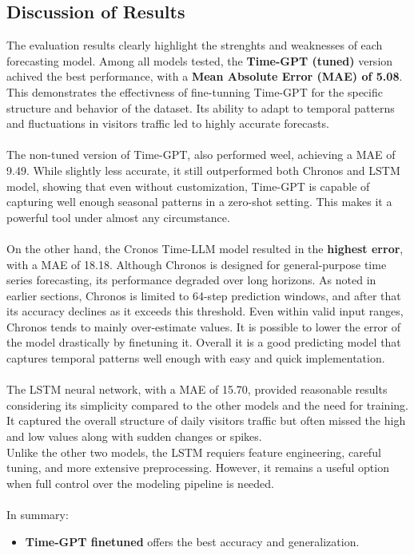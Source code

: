 \documentclass{article}
\begin{document}
\subsection{Discussion of Results}
 The evaluation results clearly highlight the strenghts and weaknesses of each forecasting model. Among all models tested, the \textbf{Time-GPT (tuned)} version achived the best performance, with a \textbf{Mean Absolute Error (MAE) of 5.08}. This demonstrates the effectivness of fine-tunning Time-GPT for the specific structure and behavior of the dataset. Its ability to adapt to temporal patterns and fluctuations in visitors traffic led to highly accurate forecasts.\\
 \\
 The non-tuned version of Time-GPT, also performed weel, achieving a MAE of 9.49. While slightly less accurate, it still outperformed both Chronos and LSTM model, showing that even without customization, Time-GPT is capable of capturing well enough seasonal patterns in a zero-shot setting. This makes it a powerful tool under almost any circumstance.\\
 \\
 On the other hand, the Cronos Time-LLM model resulted in the \textbf{highest error}, with a MAE of 18.18. Although Chronos is designed for general-purpose time series forecasting, its performance degraded over long horizons. As noted in earlier sections, Chronos is limited to 64-step prediction windows, and after that its accuracy declines as it exceeds this threshold. Even within valid input ranges, Chronos tends to mainly over-estimate values. It is possible to lower the error of the model drastically by finetuning it. Overall it is a good predicting model that captures temporal patterns well enough with easy and quick implementation.\\
 \\
The LSTM neural network, with a MAE of 15.70, provided reasonable results considering its simplicity compared to the other models and the need for training. It captured the overall structure of daily visitors traffic but often missed the high and low values along with sudden changes or spikes.\\
Unlike the other two models, the LSTM requiers feature engineering, careful tuning, and more extensive preprocessing. However, it remains a useful option when full control over the modeling pipeline is needed.\\
\\
In summary:
\begin{itemize}
    \item \textbf{Time-GPT finetuned} offers the best accuracy and generalization.
\end{itemize}
\end{document}
